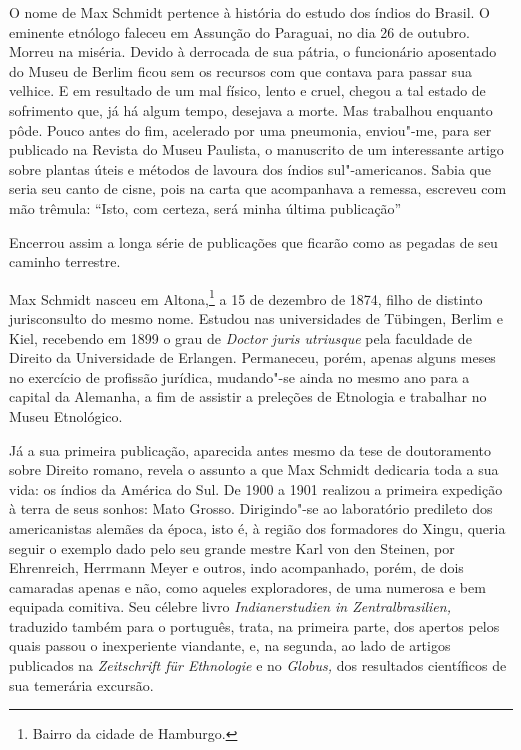 O nome de Max Schmidt pertence à história do estudo dos índios do
Brasil. O eminente etnólogo faleceu em Assunção do Paraguai, no dia 26
de outubro. Morreu na miséria. Devido à derrocada de sua pátria, o
funcionário aposentado do Museu de Berlim ficou sem os recursos com que
contava para passar sua velhice. E em resultado de um mal físico, lento
e cruel, chegou a tal estado de sofrimento que, já há algum tempo,
desejava a morte. Mas trabalhou enquanto pôde. Pouco antes do fim,
acelerado por uma pneumonia, enviou"-me, para ser publicado na Revista
do Museu Paulista, o manuscrito de um interessante artigo sobre plantas
úteis e métodos de lavoura dos índios sul"-americanos. Sabia que seria
seu canto de cisne, pois na carta que acompanhava a remessa, escreveu
com mão trêmula: ``Isto, com certeza, será minha última publicação''%

Encerrou assim a longa série de publicações que ficarão como as pegadas
de seu caminho terrestre.

{Max Schmidt nasceu em Altona,\footnote{Bairro da cidade de Hamburgo.} a
15 de dezembro de 1874, filho de distinto jurisconsulto do mesmo nome.
Estudou nas universidades de Tübingen, Berlim e Kiel, recebendo em 1899
o grau de \textit{Doctor juris utriusque} pela faculdade de Direito da
Universidade de Erlangen. Permaneceu, porém, apenas alguns meses no
exercício de profissão jurídica, mudando"-se ainda no mesmo ano para a
capital da Alemanha, a fim de assistir a preleções de Etnologia e
trabalhar no Museu Etnológico.}

Já a sua primeira publicação, aparecida antes mesmo da tese de
doutoramento sobre Direito romano, revela o assunto a que Max Schmidt
dedicaria toda a sua vida: os índios da América do Sul. De 1900 a 1901
realizou a primeira expedição à terra de seus sonhos: Mato Grosso.
Dirigindo"-se ao laboratório predileto dos americanistas alemães da
época, isto é, à região dos formadores do Xingu, queria seguir o exemplo
dado pelo seu grande mestre Karl von den Steinen, por Ehrenreich,
Herrmann Meyer e outros, indo acompanhado, porém, de dois camaradas
apenas e não, como aqueles exploradores, de uma numerosa e bem equipada
comitiva. Seu célebre livro \textit{Indianerstudien in Zentralbrasilien,}
traduzido também para o português, trata, na primeira parte, dos apertos
pelos quais passou o inexperiente viandante, e, na segunda, ao lado de
artigos publicados na \textit{Zeitschrift für Ethnologie} e no
\textit{Globus,} dos resultados científicos de sua temerária excursão.

